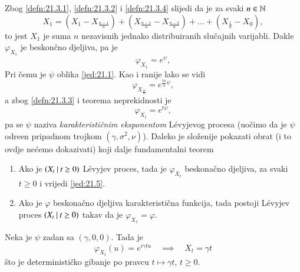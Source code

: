 Zbog \ref{defn:21.3.1}, \ref{defn:21.3.2} i \ref{defn:21.3.4} slijedi da je za svaki $n \in \mathbb{N}$
\begin{equation*}
    X_1 = (X_1 - X_{\frac{n - 1}{n}}) + (X_\frac{n - 1}{n} - X_\frac{n - 2}{n}) + \ldots + (X_\frac{1}{n} - X_0),
\end{equation*}
to jest $X_1$ je suma $n$ nezavisnih jednako distribuiranih slu\v cajnih varijabli.
Dakle $\varphi_{X_1}$ je beskon\v cno djeljiva, pa je
\begin{equation}    \label{jed:21.4}
    \varphi_{X_1} = e^\psi,
\end{equation}
Pri \v cemu je $\psi$ oblika \eqref{jed:21.1}.
Kao i ranije lako se vidi
\begin{equation}
    \varphi_{X_\frac{m}{n}} = e^{\frac{m}{n} \psi},
\end{equation}
a zbog \ref{defn:21.3.3} i teorema neprekidnosti je
\begin{equation}    \label{jed:21.5}
    \varphi_{X_t} = e^{t \psi},
\end{equation}
pa se $\psi$ naziva \emph{karakteristi\v cnim eksponentom} L\' evyjevog procesa (uo\v cimo da je $\psi$ odre\dj en pripadnom trojkom $(\gamma, \sigma^2, \nu)$).
Daleko je slo\v zenije pokazati obrat (i to ovdje ne\' cemo dokazivati) koji dalje fundamentalni teorem

\begin{tm}  \label{tm:21.6}
    \begin{enumerate}[label=(\alph*)]
        \item   \label{tm:21.6.1}
        Ako je $({X_t} \: | \: {t \geq 0})$ L\' evyjev proces, tada je $\varphi_{X_t}$ beskona\v cno djeljiva, za svaki $t \geq 0$ i vrijedi \eqref{jed:21.5}.
        \item   \label{tm:21.6.2}
        Ako je $\varphi$ beskona\v cno djeljiva karakteristi\v cna funkcija, tada postoji L\' evyjev proces $({X_t} \: | \: {t \geq 0})$ takav da je $\varphi_{X_1} = \varphi$.
    \end{enumerate}
\end{tm}

\begin{pr}  \label{pr:21.7}
    Neka je $\psi$ zadan sa $(\gamma, 0, 0)$.
    Tada je
    \begin{equation*}
        \varphi_{X_t} (u) = e^{i \gamma t u} \quad \implies \quad X_t = \gamma t
    \end{equation*} 
    \v sto je deterministi\v cko gibanje po pravcu $t \mapsto \gamma t$, $t \geq 0$.
\end{pr}

